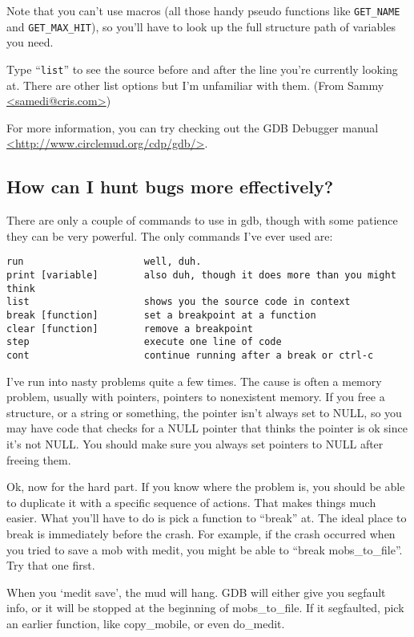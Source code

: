 \documentclass[11pt]{article}
\begin{document}
Note that you can't use macros (all those handy pseudo functions like \texttt{GET\_NAME} and \texttt{GET\_MAX\_HIT}), so you'll have to look up the full structure path of variables you need.
\par
Type ``\texttt{list}'' to see the source before and after the line you're currently looking at.  There are other list options but I'm unfamiliar with them.\newline
(From Sammy \url{<samedi@cris.com>})\par
For more information, you can try checking out the GDB Debugger manual \url{<http://www.circlemud.org/cdp/gdb/>}.

\subsection{How can I hunt bugs more effectively?}
There are only a couple of commands to use in gdb, though with some patience they can be very powerful.  The only commands I've ever used are:
\begin{verbatim}
run                     well, duh.
print [variable]        also duh, though it does more than you might think
list                    shows you the source code in context
break [function]        set a breakpoint at a function
clear [function]        remove a breakpoint
step                    execute one line of code
cont                    continue running after a break or ctrl-c
\end{verbatim}
I've run into nasty problems quite a few times.  The cause is often a memory problem, usually with pointers, pointers to nonexistent memory.  If you free a structure, or a string or something, the pointer isn't always set to NULL, so you may have code that checks for a NULL pointer that thinks the pointer is ok since it's not NULL.  You should make sure you always set pointers to NULL after freeing them.
\par
Ok, now for the hard part.  If you know where the problem is, you should be able to duplicate it with a specific sequence of actions.  That makes things much easier.  What you'll have to do is pick a function to ``break'' at.  The ideal place to break is immediately before the crash. For example, if the crash occurred when you tried to save a mob with medit, you might be able to ``break mobs\_to\_file''.  Try that one first.
\par
When you `medit save', the mud will hang.  GDB will either give you segfault info, or it will be stopped at the beginning of mobs\_to\_file.  If it segfaulted, pick an earlier function, like copy\_mobile, or even do\_medit.
\end{document}
